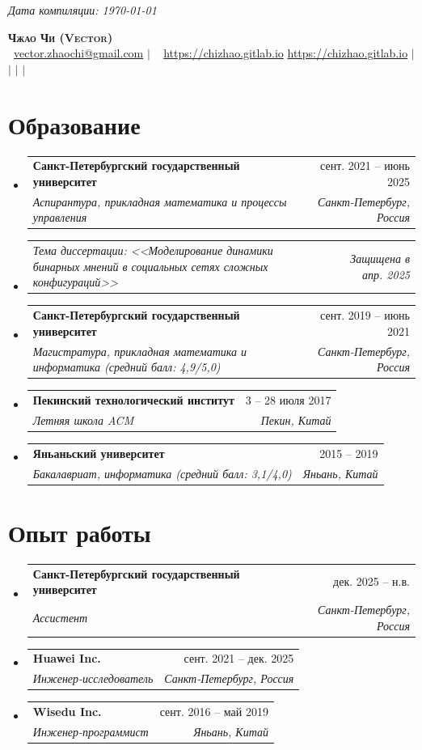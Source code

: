 \documentclass[letterpaper,10pt]{article}
\makeatletter
\newcommand{\email}[1]{\faEnvelope\ \href{mailto:#1}{#1}}
\newcommand{\linkedin}[1]{\href{#1}{\faLinkedin}}
\newcommand{\github}[1]{\href{#1}{\faGithub}}
\newcommand{\homepage}[2][]{\faLink\
  \ifthenelse{\isempty{#1}}%
    {\href{#2}{#2}}
    {\href{#2}{#1}}}
\newcommand{\researchgate}[1]{\href{#1}{\faResearchgate}}
\newcommand{\orcid}[1]{\href{#1}{\faOrcid}}
\newcommand{\resumeSubheading}[4]{
  \vspace{-2pt}\item
  \begin{tabular*}{0.97\textwidth}[t]{l@{\extracolsep{\fill}}r}
    \textbf{#1} & #2 \\
    \textit{\small#3} & \textit{\small #4} \\
  \end{tabular*}\vspace{-7pt}
}
\newcommand{\resumeSubSubheading}[2]{
  \item
  \begin{tabular*}{0.97\textwidth}{l@{\extracolsep{\fill}}r}
    \textit{\small#1} & \textit{\small #2} \\
  \end{tabular*}\vspace{-7pt}
}
\newenvironment{resumeSubHeadingList}{\begin{itemize}[leftmargin=0.15in, label={}]}{\end{itemize}}
\makeatother
\begin{document}
\begin{center}
  \begin{flushright}
    \footnotesize{\it Дата компиляции: \today{}}
  \end{flushright}
\end{center}
\begin{center}
  \textbf{\huge \scshape Чжао Чи (Vector)} \\ \vspace{1pt}
  \small \email{vector.zhaochi@gmail.com} $|$ \homepage[https://chizhao.gitlab.io]{https://chizhao.gitlab.io} $|$ \linkedin{https://www.linkedin.com/in/dandanv5} $|$ \github{https://github.com/vectorsss} $|$
  \researchgate{https://www.researchgate.net/profile/Chi-Zhao-4} $|$ \orcid{https://orcid.org/0000-0002-1166-7578}
\end{center}

\section{Образование}
\begin{resumeSubHeadingList}
  \resumeSubheading
    {Санкт-Петербургский государственный университет}{сент. 2021 -- июнь 2025}
    {Аспирантура, прикладная математика и процессы управления}{Санкт-Петербург, Россия}
    \resumeSubSubheading
    {Тема диссертации: <<Моделирование динамики бинарных мнений в социальных сетях сложных конфигураций>>}{Защищена в апр. 2025}

  \resumeSubheading
    {Санкт-Петербургский государственный университет}{сент. 2019 -- июнь 2021}
    {Магистратура, прикладная математика и информатика (средний балл: 4,9/5,0)}{Санкт-Петербург, Россия}

  \resumeSubheading
    {Пекинский технологический институт}{3 -- 28 июля 2017}
    {Летняя школа ACM}{Пекин, Китай}

  \resumeSubheading
    {Яньаньский университет}{2015 -- 2019}
    {Бакалавриат, информатика (средний балл: 3,1/4,0)}{Яньань, Китай}
\end{resumeSubHeadingList}

\section{Опыт работы}
\begin{resumeSubHeadingList}
  \resumeSubheading
    {Санкт-Петербургский государственный университет}{дек. 2025 -- н.в.}
    {Ассистент}{Санкт-Петербург, Россия}
  \resumeSubheading
    {Huawei Inc.}{сент. 2021 -- дек. 2025}
    {Инженер-исследователь}{Санкт-Петербург, Россия}
  \resumeSubheading
    {Wisedu Inc.}{сент. 2016 -- май 2019}
    {Инженер-программист}{Яньань, Китай}

\end{resumeSubHeadingList}
\end{document}
